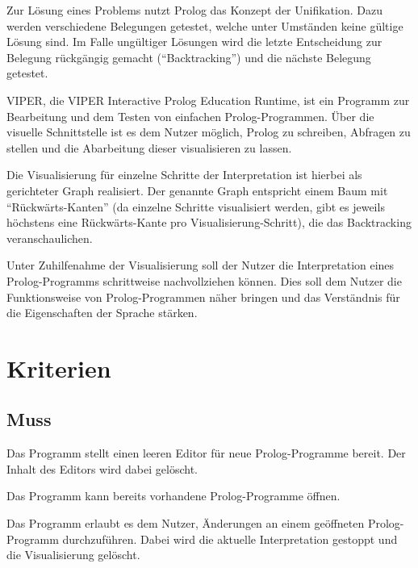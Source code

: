 \documentclass[parskip=full,11pt,twoside]{scrartcl}
\begin{document}
Zur Lösung eines Problems nutzt Prolog das Konzept der Unifikation. Dazu werden verschiedene Belegungen getestet, welche unter Umständen keine gültige Lösung sind. Im Falle ungültiger Lösungen wird die letzte Entscheidung zur Belegung rückgängig gemacht (\enquote{Backtracking}) und die nächste Belegung getestet.

VIPER, die VIPER Interactive Prolog Education Runtime, ist ein Programm zur Bearbeitung und dem Testen von einfachen Prolog-Programmen. Über die visuelle Schnittstelle ist es dem Nutzer möglich, Prolog zu schreiben, Abfragen zu stellen und die Abarbeitung dieser visualisieren zu lassen.

Die Visualisierung für einzelne Schritte der Interpretation ist hierbei als gerichteter Graph realisiert. Der genannte Graph entspricht einem Baum mit \enquote{Rückwärts-Kanten} (da einzelne Schritte visualisiert werden, gibt es jeweils höchstens eine Rückwärts-Kante pro Visualisierung-Schritt), die das Backtracking veranschaulichen.

Unter Zuhilfenahme der Visualisierung soll der Nutzer die Interpretation eines Prolog-Programms schrittweise nachvollziehen können. Dies soll dem Nutzer die Funktionsweise von Prolog-Programmen näher bringen und das Verständnis für die Eigenschaften der Sprache stärken.

\section{Kriterien}

\subsection{Muss}


Das Programm stellt einen leeren Editor für neue Prolog-Programme bereit. Der Inhalt des Editors wird dabei gelöscht.


Das Programm kann bereits vorhandene Prolog-Programme öffnen.


Das Programm erlaubt es dem Nutzer, Änderungen an einem geöffneten Prolog-Programm durchzuführen. Dabei wird die aktuelle Interpretation gestoppt und die Visualisierung gelöscht.

\end{document}
